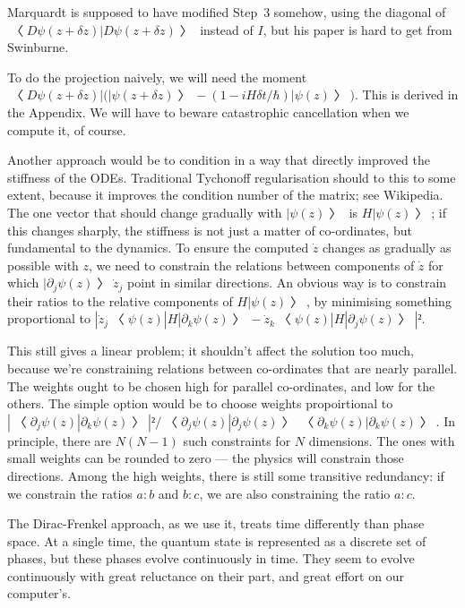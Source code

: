 Marquardt is supposed to have modified Step~3 somehow, using the diagonal of $〈Dψ(z+δz)|Dψ(z+δz)〉$ instead of $I$, but his paper is hard to get from Swinburne.

To do the projection naively, we will need the moment $〈Dψ(z+δz)|\bigl(|ψ(z+δz)〉-(1-iHδt/\hbar)|ψ(z)〉\bigr)$.  This is derived in the Appendix.  We will have to beware catastrophic cancellation when we compute it, of course.


Another approach would be to condition in a way that directly improved the stiffness of the ODEs.  Traditional Tychonoff regularisation should to this to some extent, because it improves the condition number of the matrix; see Wikipedia.  The one vector that should change gradually with $|ψ(z)〉$ is $H|ψ(z)〉$; if this changes sharply, the stiffness is not just a matter of co-ordinates, but fundamental to the dynamics.  To ensure the computed $\dot z$ changes as gradually as possible with $z$, we need to constrain the relations between components of $\dot z$ for which $|∂_jψ(z)〉{\dot z}_j$ point in similar directions.  An obvious way is to constrain their ratios to the relative components of $H|ψ(z)〉$, by minimising something proportional to $|{\dot z}_j〈ψ(z)|H|∂_kψ(z)〉-{\dot z}_k〈ψ(z)|H|∂_jψ(z)〉|²$. 

This still gives a linear problem; it shouldn't affect the solution too much, because we're constraining relations between co-ordinates that are nearly parallel.  The weights ought to be chosen high for parallel co-ordinates, and low for the others.  The simple option would be to choose weights propoirtional to $|〈∂_jψ(z)|∂_kψ(z)〉|²/〈∂_jψ(z)|∂_jψ(z)〉〈∂_kψ(z)|∂_kψ(z)〉$.  In principle, there are $N(N-1)$ such constraints for $N$ dimensions.  The ones with small weights can be rounded to zero --- the physics will constrain those directions.  Among the high weights, there is still some transitive redundancy: if we constrain the ratios $a:b$ and $b:c$, we are also constraining the ratio $a:c$.


The Dirac-Frenkel approach, as we use it, treats time differently than phase space.  At a single time, the quantum state is represented as a discrete set of phases, but these phases evolve continuously in time.  They seem to evolve continuously with great reluctance on their part, and great effort on our computer's.

